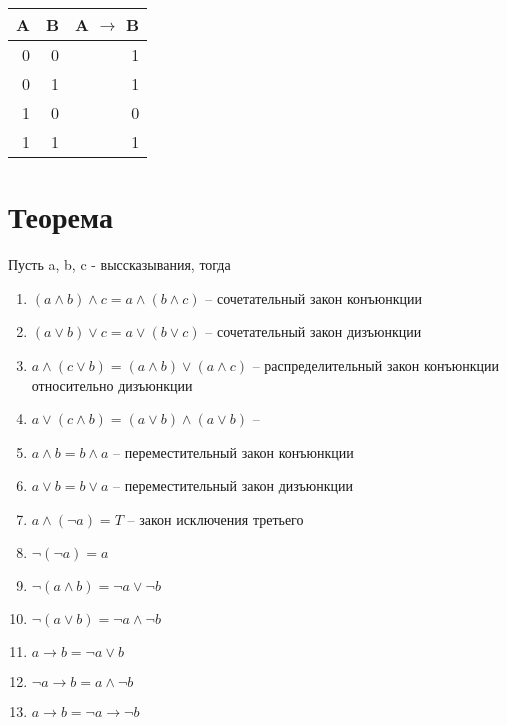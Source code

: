 \documentclass[letterpaper]{article}
\begin{document}
\begin{center}
\begin{tabular}{rrr}
A & B & A \(\rightarrow\) B\\
\hline
0 & 0 & 1\\
0 & 1 & 1\\
1 & 0 & 0\\
1 & 1 & 1\\
\end{tabular}
\end{center}
\section{Теорема}
\label{sec:orgc2531f1}
Пусть a, b, c - выссказывания, тогда

\begin{enumerate}
\item \((a \land b) \land c = a \land (b \land c)\) -- сочетательный закон конъюнкции
\item \((a \lor b) \lor c = a \lor (b \lor c)\) -- сочетательный закон дизъюнкции
\item \(a \land (c \lor b) = (a \land b) \lor (a \land c)\) -- распределительный закон конъюнкции относительно дизъюнкции
\item \(a \lor (c \land b) = (a \lor b) \land (a \lor b)\) --
\item \(a \land b = b \land a\) -- переместительный закон конъюнкции
\item \(a \lor b = b \lor a\) -- переместительный закон дизъюнкции
\item \(a \land (\neg{a}) = T\) -- закон исключения третьего
\item \(\neg{(\neg{a})} = a\)
\item \(\neg{(a \land b)} = \neg{a} \lor \neg{b}\)
\item \(\neg{(a \lor b)} = \neg{a} \land \neg{b}\)
\item \(a \rightarrow b = \neg{a} \lor b\)
\item \(\neg{a \rightarrow b} = {a} \land \neg{b}\)
\item \(a \rightarrow b = \neg{a} \rightarrow \neg{b}\)
\end{enumerate}
\end{document}
